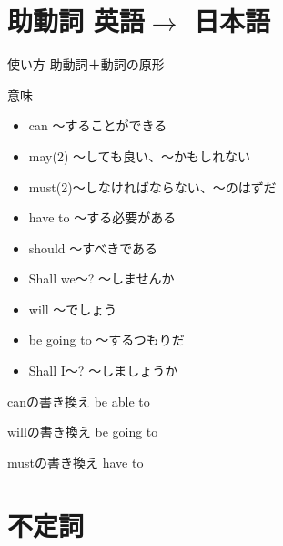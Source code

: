 \documentclass[10pt]{jsarticle}
\newcommand{\answer}[2]{{\color{orange}#2}}
\newcommand{\answer}[2]{\vspace{#1mm}}
\begin{document}
\newpage

\section{助動詞 英語$\rightarrow$ 日本語}
\begin{itembox}[l]{使い方}
	\answer{8}{助動詞＋動詞の原形}
\end{itembox}

\begin{itembox}[l]{意味}

	\begin{itemize}
		\item can \answer{5}{〜することができる}
		\item may(2) \answer{5}{〜しても良い、〜かもしれない}
		\item must(2)\answer{3}{〜しなければならない、〜のはずだ}
	\end{itemize}
	\begin{multicols}{2}
		\begin{itemize}
			\item have to \answer{5}{〜する必要がある}
			\item should \answer{5}{〜すべきである}
			\item Shall we〜? \answer{5}{〜しませんか}
			\item will \answer{5}{〜でしょう}
			\item be going to \answer{5}{〜するつもりだ}
			\item Shall I〜? \answer{5}{〜しましょうか}
		\end{itemize}
	\end{multicols}

\end{itembox}


\begin{multicols}{2}
	\begin{itembox}[l]{canの書き換え}
		\answer{8}{be able to}
	\end{itembox}
	\begin{itembox}[l]{willの書き換え}
		\answer{8}{be going to}
	\end{itembox}
	\begin{itembox}[l]{mustの書き換え}
		\answer{8}{have to}
	\end{itembox}
\end{multicols}




\section{不定詞}
\end{document}
